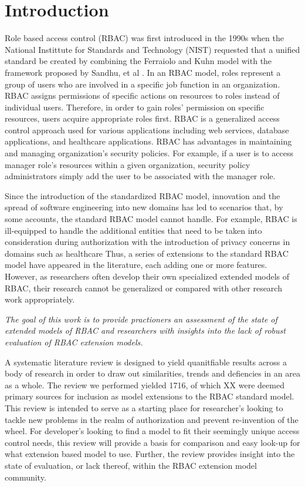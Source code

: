 \section{Introduction} \label{sec:introduction}

Role based access control (RBAC) was first introduced in the 1990s when the National Instittute for Standards and Technology (NIST) requested that a unified standard be created by combining the Ferraiolo and Kuhn model \cite{ferraiolokuhn} with the framework proposed by Sandhu, et al \cite{sandhu1996role}.  In an RBAC model, roles represent a group of users who are involved in a specific job function in an organization. RBAC assigns permissions of specific actions on resources to roles instead of individual users.  Therefore, in order to gain roles' permission on specific resources, users acquire appropriate roles first.  RBAC is a generalized access control approach used for various applications including web services, database applications, and healthcare applications.  RBAC has advantages in maintaining and managing organization's security policies.  For example, if a user is to access manager role's resources within a given organization, security policy administrators simply add the user to be associated with the manager role.

Since the introduction of the standardized RBAC model, innovation and the spread of software engineering into new domains has led to scenarios that, by some accounts, the standard RBAC model cannot handle.  For example, RBAC is ill-equipped to handle the additional entities that need to be taken into consideration during authorization with the introduction of privacy concerns in domains such as healthcare  Thus, a series of extensions to the standard RBAC model have appeared in the literature, each adding one or more features.  However, as researchers often develop their own specialized extended models of RBAC, their research cannot be generalized or compared with other research work appropriately.

\textit{The goal of this work is to provide practioners an assessment of the state of extended models of RBAC and researchers with insights into the lack of robust evaluation of RBAC extension models.}

A systematic literature review is designed to yield quanitfiable results across a body of research in order to draw out similarities, trends and defiencies in an area as a whole.  The review we performed yielded 1716, of which XX were deemed primary sources for inclusion as model extensions to the RBAC standard model.  This review is intended to serve as a starting place for researcher's looking to tackle new problems in the realm of authorization and prevent re-invention of the wheel. For developer's looking to find a model to fit their seemingly unique access control needs, this review will provide a basis for comparison and easy look-up for what extension based model to use.  Further, the review provides insight into the state of evaluation, or lack thereof, within the RBAC extension model community.

